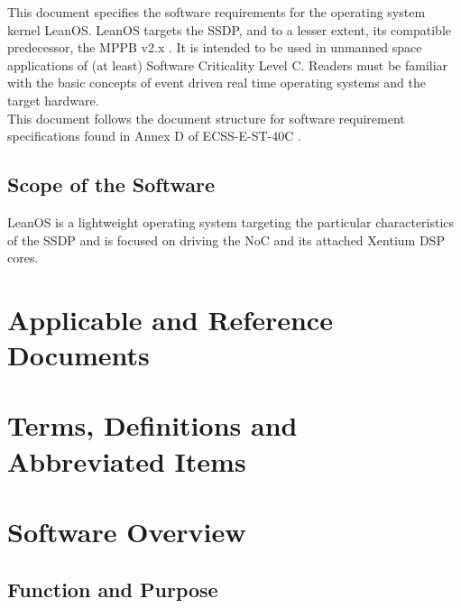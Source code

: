 This document specifies the software requirements for the operating system
kernel LeanOS. LeanOS targets the \gls{SSDP}, and to a lesser extent, its
compatible predecessor, the \gls{MPPB} v2.x \cite{MPPB}.
It is intended to be used in unmanned space applications of (at least)
Software Criticality Level C. Readers must be familiar with the basic concepts
of event driven real time operating systems and the target hardware. \\

\noindent
This document follows the document structure for software requirement
specifications found in Annex D of ECSS-E-ST-40C \cite{ECSS40C}.

\section{Scope of the Software}

LeanOS is a lightweight operating system targeting the particular
characteristics of the \gls{SSDP} and is focused on driving the \gls{NoC} and
its attached \gls{Xentium} \gls{DSP} cores.

\chapter{Applicable and Reference Documents} %

\printbibliography[heading=none]


\chapter{Terms, Definitions and Abbreviated Items}
\printglossary[type=acronym]
\printglossary[type=main, style=altlist]



\chapter{Software Overview}

\section{Function and Purpose}

